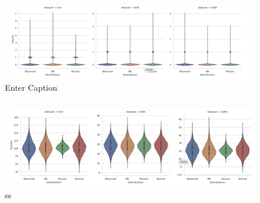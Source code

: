 \begin{figure}[t]
    \centering
    \includegraphics[width=1\linewidth]{images/violin_plots_per_pulse.png}
    \caption{Enter Caption}
\end{figure}

\begin{figure}[htbp]
    \centering
    \includegraphics[width=1\linewidth]{images/violinplots_per_train.png}
    \caption{ss}
    \label{s}   
\end{figure}